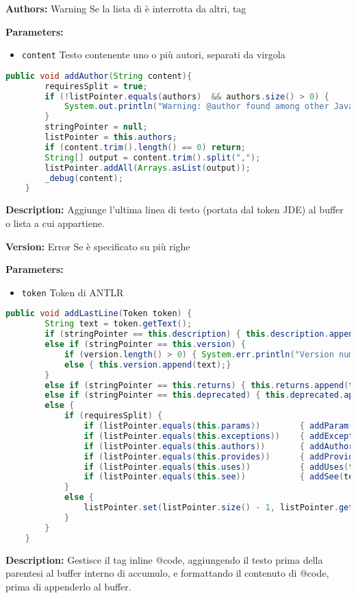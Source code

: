 \documentclass{article}
\makeatletter
\newcommand\atsign{@}
\makeatother
\begin{document}
\textbf{Authors:} Warning Se la lista di è interrotta da altri, tag

\textbf{Parameters:}
\begin{itemize}
  \item\texttt{content} Testo contenente uno o più autori, separati da virgola  
\end{itemize}

\begin{lstlisting}[language=Java]
    public void addAuthor(String content){
        requiresSplit = true;
        if (!listPointer.equals(authors)  && authors.size() > 0) {
            System.out.println("Warning: @author found among other Javadoc keywords. You should put all authors together.");
        }
        stringPointer = null;
        listPointer = this.authors;
        if (content.trim().length() == 0) return;
        String[] output = content.trim().split(",");
        listPointer.addAll(Arrays.asList(output));
        _debug(content);
    }
\end{lstlisting}
\vspace{0.5cm}
\textbf{Description:}  Aggiunge l'ultima linea di testo (portata dal token JDE) al buffer o lista a cui appartiene. 

\textbf{Version:} Error Se è specificato su più righe

\textbf{Parameters:}
\begin{itemize}
  \item\texttt{token} Token di ANTLR  
\end{itemize}

\begin{lstlisting}[language=Java]
    public void addLastLine(Token token) {
        String text = token.getText();
        if (stringPointer == this.description) { this.description.append(text); }
        else if (stringPointer == this.version) {
            if (version.length() > 0) { System.err.println("Version number must be specified on a single line at line " + token.getLine()); }
            else { this.version.append(text);}
        }
        else if (stringPointer == this.returns) { this.returns.append(text); }
        else if (stringPointer == this.deprecated) { this.deprecated.append(text); }
        else {
            if (requiresSplit) {
                if (listPointer.equals(this.params))        { addParam(text); }
                if (listPointer.equals(this.exceptions))    { addException(text); }
                if (listPointer.equals(this.authors))       { addAuthor(text); }
                if (listPointer.equals(this.provides))      { addProvides(text); }
                if (listPointer.equals(this.uses))          { addUses(text); }
                if (listPointer.equals(this.see))           { addSee(text); }
            }
            else {
                listPointer.set(listPointer.size() - 1, listPointer.get(listPointer.size() - 1).concat(" " + text));
            }
        }
    }
\end{lstlisting}
\vspace{0.5cm}
\textbf{Description:}  Gestisce il tag inline \atsign code, aggiungendo il testo prima della parentesi al buffer interno di accumulo, e formattando il contenuto di \atsign code, prima di appenderlo al buffer.  
\end{document}
